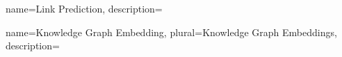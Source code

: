 {
    name=Link Prediction,
    description={}
}

{
    name=Knowledge Graph Embedding,
    plural=Knowledge Graph Embeddings,
    description={}
}

